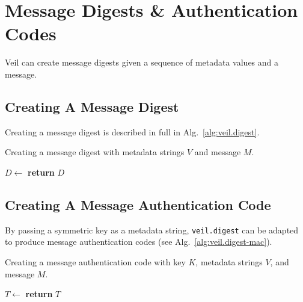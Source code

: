 \section{Message Digests \& Authentication Codes}\label{sec:veil.digest}

Veil can create message digests given a sequence of metadata values and a message.

\subsection{Creating A Message Digest}\label{subsec:veil.digest-digest}

Creating a message digest is described in full in Alg.~\ref{alg:veil.digest}\@.

\begin{algorithm}
    \caption{Creating a message digest with metadata strings $V$ and message $M$.}
    \begin{algorithmic}
        \State {}
        \State {}
        \EndFor
        \State {}
        \State $D \gets $
        \State \textbf{return} $D$
        \EndFunction
    \end{algorithmic}
    \label{alg:veil.digest}
\end{algorithm}

\subsection{Creating A Message Authentication Code}\label{subsec:veil.digest-mac}

By passing a symmetric key as a metadata string, \texttt{veil.digest} can be adapted to produce
message authentication codes (see Alg.~\ref{alg:veil.digest-mac}).

\begin{algorithm}
    \caption{Creating a message authentication code with key $K$, metadata strings $V$, and message
        $M$.}
    \begin{algorithmic}
        \State $T \gets $
        \State \textbf{return} $T$
        \EndFunction
    \end{algorithmic}
    \label{alg:veil.digest-mac}
\end{algorithm}


